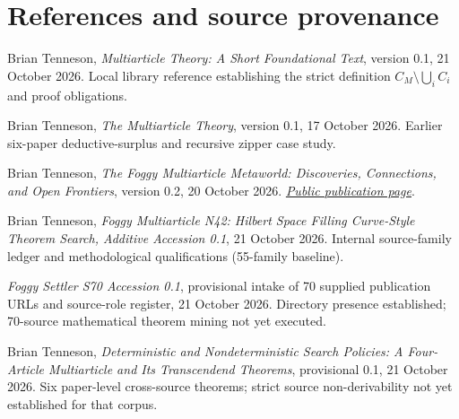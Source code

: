 \documentclass[11pt,letterpaper]{article}
\begin{document}
\section*{References and source provenance}
\begin{enumerate}[label={[\arabic*]},leftmargin=2.2em,itemsep=3pt]
\item Brian Tenneson, \emph{Multiarticle Theory: A Short Foundational Text}, version 0.1, 21 October 2026. Local library reference establishing the strict definition $C_M\setminus\bigcup_i C_i$ and proof obligations.
\item Brian Tenneson, \emph{The Multiarticle Theory}, version 0.1, 17 October 2026. Earlier six-paper deductive-surplus and recursive zipper case study.
\item Brian Tenneson, \emph{The Foggy Multiarticle Metaworld: Discoveries, Connections, and Open Frontiers}, version 0.2, 20 October 2026. \href{https://btenneson.github.io/pub/cs.LO_Logic_in_Computer_Science/foggy_multiarticle_metaworld_discoveries_connections_open_frontiers_0_2/}{\textit{Public publication page}}.
\item Brian Tenneson, \emph{Foggy Multiarticle N42: Hilbert Space Filling Curve-Style Theorem Search, Additive Accession 0.1}, 21 October 2026. Internal source-family ledger and methodological qualifications (55-family baseline).
\item \emph{Foggy Settler S70 Accession 0.1}, provisional intake of 70 supplied publication URLs and source-role register, 21 October 2026. Directory presence established; 70-source mathematical theorem mining not yet executed.
\item Brian Tenneson, \emph{Deterministic and Nondeterministic Search Policies: A Four-Article Multiarticle and Its Transcendend Theorems}, provisional 0.1, 21 October 2026. Six paper-level cross-source theorems; strict source non-derivability not yet established for that corpus.
\end{enumerate}
\end{document}
